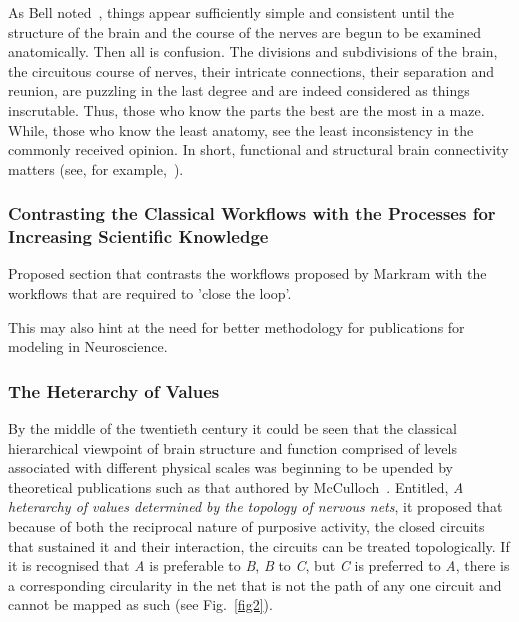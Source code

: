 \documentclass[10pt,letterpaper]{article}
\begin{document}
As Bell noted~\cite{bell11}, things appear sufficiently simple and consistent until the structure of the brain and the course of the nerves are begun to be examined anatomically. Then all is confusion. The divisions and subdivisions of the brain, the circuitous course of nerves, their intricate connections, their separation and reunion, are puzzling in the last degree and are indeed considered as things inscrutable. Thus, those who know the parts the best are the most in a maze. While, those who know the least anatomy, see the least inconsistency in the commonly received opinion. In short, functional and structural brain connectivity matters (see, for example,~\cite{gili18}).

\subsubsection*{Contrasting the Classical Workflows with the Processes for Increasing Scientific Knowledge}

Proposed section that contrasts the workflows proposed by Markram with the workflows that are required to 'close the loop'.

This may also hint at the need for better methodology for publications for modeling in Neuroscience.



\subsubsection*{The Heterarchy of Values}

By the middle of the twentieth century it could be seen that the classical hierarchical viewpoint of brain structure and function comprised of levels associated with different physical scales was beginning to be upended by theoretical publications such as that authored by McCulloch~\cite{mcculloch45a}. Entitled, {\it{A heterarchy of values determined by the topology of nervous nets}}, it proposed that because of both the reciprocal nature of purposive activity, the closed circuits that sustained it and their interaction, the circuits can be treated topologically. If it is recognised that {\it{A}} is preferable to {\it{B}}, {\it{B}} to {\it{C}}, but {\it{C}} is preferred to {\it{A}}, there is a  corresponding circularity in the net that is not the path of any one circuit and cannot be mapped as such (see Fig.~\ref{fig2}).
\end{document}
